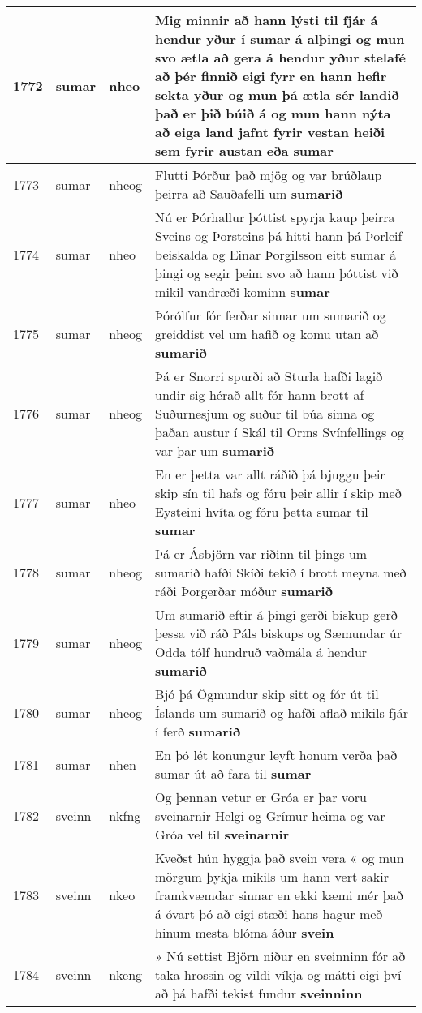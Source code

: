 \documentclass{article}
\begin{document}
\begin{longtable}{p{1cm}|p{1cm}|p{1cm}|p{13cm}}
\hline
1772&sumar&nheo&Mig minnir að hann lýsti til fjár á hendur yður í sumar á alþingi og mun svo ætla að gera á hendur yður stelafé að þér finnið eigi fyrr en hann hefir sekta yður og mun þá ætla sér landið það er þið búið á og mun hann nýta að eiga land jafnt fyrir vestan heiði sem fyrir austan eða \textbf{sumar} \\
\hline
1773&sumar&nheog&Flutti Þórður það mjög og var brúðlaup þeirra að Sauðafelli um \textbf{sumarið} \\
\hline
1774&sumar&nheo&Nú er Þórhallur þóttist spyrja kaup þeirra Sveins og Þorsteins þá hitti hann þá Þorleif beiskalda og Einar Þorgilsson eitt sumar á þingi og segir þeim svo að hann þóttist við mikil vandræði kominn \textbf{sumar} \\
\hline
1775&sumar&nheog&Þórólfur fór ferðar sinnar um sumarið og greiddist vel um hafið og komu utan að \textbf{sumarið} \\
\hline
1776&sumar&nheog&Þá er Snorri spurði að Sturla hafði lagið undir sig hérað allt fór hann brott af Suðurnesjum og suður til búa sinna og þaðan austur í Skál til Orms Svínfellings og var þar um \textbf{sumarið} \\
\hline
1777&sumar&nheo&En er þetta var allt ráðið þá bjuggu þeir skip sín til hafs og fóru þeir allir í skip með Eysteini hvíta og fóru þetta sumar til \textbf{sumar} \\
\hline
1778&sumar&nheog&Þá er Ásbjörn var riðinn til þings um sumarið hafði Skíði tekið í brott meyna með ráði Þorgerðar móður \textbf{sumarið} \\
\hline
1779&sumar&nheog&Um sumarið eftir á þingi gerði biskup gerð þessa við ráð Páls biskups og Sæmundar úr Odda tólf hundruð vaðmála á hendur \textbf{sumarið} \\
\hline
1780&sumar&nheog&Bjó þá Ögmundur skip sitt og fór út til Íslands um sumarið og hafði aflað mikils fjár í ferð \textbf{sumarið} \\
\hline
1781&sumar&nhen&En þó lét konungur leyft honum verða það sumar út að fara til \textbf{sumar} \\
\hline
1782&sveinn&nkfng&Og þennan vetur er Gróa er þar voru sveinarnir Helgi og Grímur heima og var Gróa vel til \textbf{sveinarnir} \\
\hline
1783&sveinn&nkeo&Kveðst hún hyggja það svein vera « og mun mörgum þykja mikils um hann vert sakir framkvæmdar sinnar en ekki kæmi mér það á óvart þó að eigi stæði hans hagur með hinum mesta blóma áður \textbf{svein} \\
\hline
1784&sveinn&nkeng&» Nú settist Björn niður en sveinninn fór að taka hrossin og vildi víkja og mátti eigi því að þá hafði tekist fundur \textbf{sveinninn} \\

\end{longtable}
\end{document}
